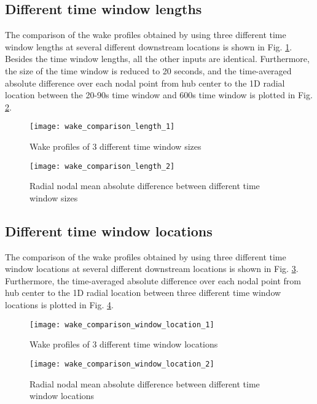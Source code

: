 \documentclass{umthesis}
\begin{document}
\subsection{Different time window lengths}
The comparison of the wake profiles obtained by using three different time window lengths at several different downstream locations is shown in Fig. \ref{fig:wake_comparison_length_1}. Besides the time window lengths, all the other inputs are identical. Furthermore, the size of the time window is reduced to 20 seconds, and the time-averaged absolute difference over each nodal point from hub center to the 1D radial location between the 20-90s time window and 600s time window is plotted in Fig. \ref{fig:wake_comparison_length_2}.
\begin{figure}
  \centering
  \texttt{[image: wake\_comparison\_length\_1]}
  \caption{Wake profiles of 3 different time window sizes}\label{fig:wake_comparison_length_1}
\end{figure}
\begin{figure}
  \centering
  \texttt{[image: wake\_comparison\_length\_2]}
  \caption{Radial nodal mean absolute difference between different time window sizes}\label{fig:wake_comparison_length_2}
\end{figure}


\subsection{Different time window locations}
The comparison of the wake profiles obtained by using three different time window locations at several different downstream locations is shown in Fig. \ref{fig:wake_comparison_window_location_1}. Furthermore, the time-averaged absolute difference over each nodal point from hub center to the 1D radial location between three different time window locations is plotted in Fig. \ref{fig:wake_comparison_window_location_2}.
\begin{figure}
  \centering
  \texttt{[image: wake\_comparison\_window\_location\_1]}
  \caption{Wake profiles of 3 different time window locations}\label{fig:wake_comparison_window_location_1}
\end{figure}
\begin{figure}
  \centering
  \texttt{[image: wake\_comparison\_window\_location\_2]}
  \caption{Radial nodal mean absolute difference between different time window locations}\label{fig:wake_comparison_window_location_2}
\end{figure}
\end{document}
